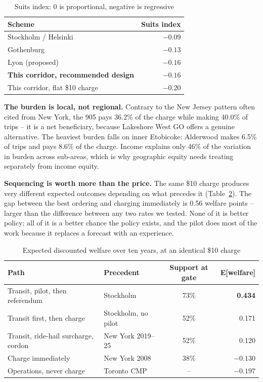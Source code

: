 \documentclass[11pt,letterpaper]{article}
\begin{document}
\begin{table}[h]
\begin{singlespace}
\centering
\small
\caption{Suits index: 0 is proportional, negative is regressive}
\label{tab:suits}
\begin{tabular}{lr}
\toprule
\textbf{Scheme} & \textbf{Suits index} \\
\midrule
Stockholm / Helsinki & $-0.09$ \\
Gothenburg & $-0.13$ \\
Lyon (proposed) & $-0.16$ \\
\textbf{This corridor, recommended design} & $\mathbf{-0.16}$ \\
This corridor, flat \$10 charge & $-0.20$ \\
\bottomrule
\end{tabular}
\end{singlespace}
\end{table}

\textbf{The burden is local, not regional.} Contrary to the New Jersey pattern
often cited from New York, the 905 pays 36.2\% of the charge while making 40.0\%
of trips -- it is a net beneficiary, because Lakeshore West GO offers a genuine
alternative. The heaviest burden falls on inner Etobicoke: Alderwood makes 6.5\%
of trips and pays 8.6\% of the charge. Income explains only 46\% of the
variation in burden across sub-areas, which is why geographic equity needs
treating separately from income equity.

\textbf{Sequencing is worth more than the price.} The same \$10 charge produces
very different expected outcomes depending on what precedes it
(Table~\ref{tab:seq}). The gap between the best ordering and charging
immediately is 0.56 welfare points -- larger than the difference between any two
rates we tested. None of it is better policy; all of it is a better chance the
policy exists, and the pilot does most of the work because it replaces a
forecast with an experience.

\begin{table}[h]
\begin{singlespace}
\centering
\small
\caption{Expected discounted welfare over ten years, at an identical \$10 charge}
\label{tab:seq}
\begin{tabular}{llcr}
\toprule
\textbf{Path} & \textbf{Precedent} & \textbf{Support at gate} & \textbf{E[welfare]} \\
\midrule
Transit, pilot, then referendum & Stockholm & 73\% & \textbf{0.434} \\
Transit first, then charge & Stockholm, no pilot & 52\% & 0.171 \\
Transit, ride-hail surcharge, cordon & New York 2019--25 & 52\% & 0.120 \\
Charge immediately & New York 2008 & 38\% & $-0.130$ \\
Operations, never charge & Toronto CMP & -- & $-0.197$ \\
\bottomrule
\end{tabular}
\end{singlespace}
\end{table}
\end{document}

